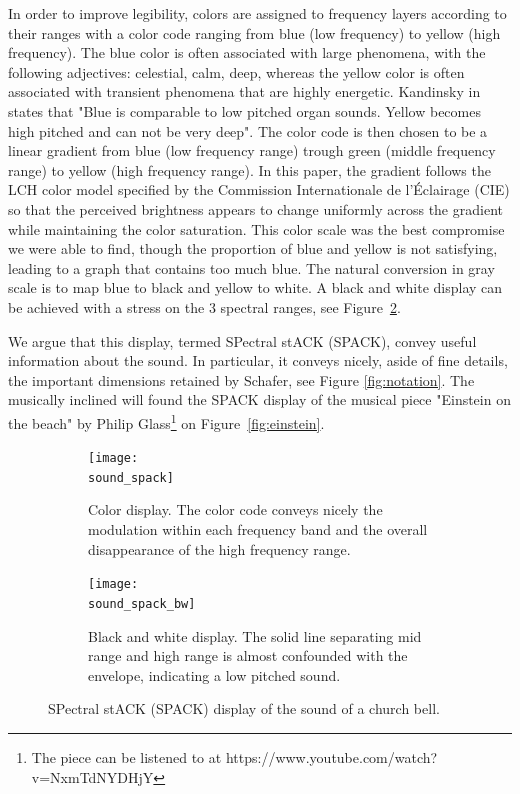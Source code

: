 \documentclass{article}
\newcommand\sound{churchBell}
\begin{document}
In order to improve legibility, colors are assigned to frequency layers according to their ranges with a color code ranging from blue (low frequency) to yellow (high frequency).
The blue color is often associated with large phenomena, with the following adjectives: celestial, calm, deep, whereas the yellow color is often associated with transient phenomena that are highly energetic. Kandinsky in \cite{Kandinsky1954} states that "Blue is comparable to low pitched organ sounds. Yellow becomes high pitched and can not be very deep". The color code is then chosen to be a linear gradient from blue (low frequency range) trough green (middle frequency range) to yellow (high frequency range). In this paper, the gradient follows the LCH color model specified by the Commission Internationale de l'\'Eclairage (CIE) so that the perceived brightness appears to change uniformly across the gradient while maintaining the color saturation. This color scale was the best compromise we were able to find, though the proportion of blue and yellow is not satisfying, leading to a graph that contains too much blue. The natural conversion in gray scale is to map blue to black and yellow to white. A black and white display can be achieved with a stress on the 3 spectral ranges, see Figure~\ref{fig:spack_bw}. %

We argue that this display, termed SPectral stACK (SPACK), convey useful information about the sound. In particular, it conveys nicely, aside of fine details, the important dimensions retained by Schafer, see Figure \ref{fig:notation}. The musically inclined will found the SPACK display of the musical piece "Einstein on the beach" by Philip Glass\footnote{The piece can be listened to at {https://www.youtube.com/watch?v=NxmTdNYDHjY}} on Figure~\ref{fig:einstein}.


\begin{figure}[h]
 \centering
\begin{subfigure}[b]{.5\textwidth}
\caption{Color display. The color code conveys nicely the modulation within each frequency band and the overall disappearance of the high frequency range.}
\texttt{[image: \\sound\_spack]}
\label{fig:spack_color}
\end{subfigure}
\begin{subfigure}[b]{.5\textwidth}
\caption{Black and white display. The solid line separating mid range and high range is almost confounded with the envelope, indicating a low pitched sound.}
\texttt{[image: \\sound\_spack\_bw]}
\label{fig:spack_bw}
\end{subfigure}
\caption{SPectral stACK (SPACK) display of the sound of a church bell.}
\label{fig:spack}
\end{figure}
\end{document}

